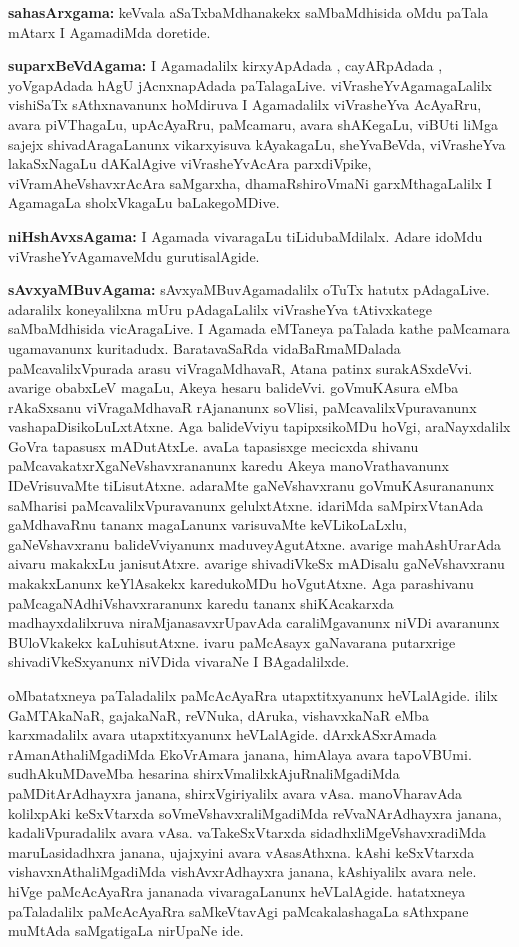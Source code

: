 \textbf{sahasArxgama:} keVvala aSaTxbaMdhanakekx saMbaMdhisida oMdu paTala mAtarx I AgamadiMda doretide.

\textbf{suparxBeVdAgama:} I Agamadalilx kirxyApAdada , cayARpAdada , yoVgapAdada  hAgU jAcnxnapAdada  paTalagaLive. viVrasheYvAgamagaLalilx vishiSaTx sAthxnavanunx hoMdiruva I Agamadalilx viVrasheYva AcAyaRru, avara piVThagaLu, upA\-cAyaRru, paMca\-maru, avara shAKegaLu, viBUti liMga sajejx shivadAragaLanunx vikarxyisuva kAyakagaLu, sheYvaBeVda, viVrasheYva lakaSxNagaLu dAKalAgive viVrasheYvAcAra parxdiVpike, viVramAheVshavxrAcAra saMgarxha, dhamaRshiroVmaNi garxMthagaLalilx I AgamagaLa sholxVkagaLu baLakegoMDive.

\textbf{niHshAvxsAgama:} I Agamada vivaragaLu tiLidubaMdilalx. Adare idoMdu viVrasheYvAgamaveMdu gurutisalAgide.

\textbf{sAvxyaMBuvAgama:}  sAvxyaMBuvAgamadalilx oTuTx hatutx pAdagaLive. adaralilx koneyalilxna mUru pAdagaLalilx viVrasheYva tAtivxkatege saMbaMdhisida vicAragaLive. I Agamada eMTaneya paTalada kathe paMcamara ugamavanunx kuritadudx. BaratavaSaRda vidaBaRmaMDalada paMcavalilxVpurada arasu viVragaMdhavaR, Atana patinx surakASxdeVvi. avarige obabxLeV magaLu, Akeya hesaru balideVvi. goVmuKAsura eMba rAkaSxsanu viVragaMdhavaR rAjananunx soVlisi, paMcavalilxVpuravanunx vashapaDisikoLuLxtAtxne. Aga balideVviyu tapipxsikoMDu hoVgi, araNayxdalilx GoVra tapasusx mADutAtxLe. avaLa tapasisxge mecicxda shivanu paMcavakatxrXgaNeVshavxrananunx karedu Akeya manoVrathavanunx IDeVrisuvaMte tiLisutAtxne. adaraMte gaNeVshavxranu goVmuKAsurananunx saMharisi paMcavalilxV\-puravanunx gelulxtAtxne. idariMda saMpirxVtanAda gaMdhavaRnu tananx magaLanunx varisuvaMte keVLikoLaLxlu, gaNeVshavxranu balideVviyanunx maduveyAgutAtxne. avarige mahAshUrarAda aivaru makakxLu janisutAtxre. avarige shivadiVkeSx mADisalu gaNeVshavxranu makakxLanunx \hbox{keYlAsakekx} karedukoMDu hoVgutAtxne. Aga parashivanu paMcagaNAdhiVshavxraranunx karedu tananx shiKAcakarxda madhayxdalilxruva niraMjana\-savxrUpa\-vAda caraliMgavanunx niVDi avaranunx BUloVkakekx kaLuhisutAtxne. ivaru paMcAsayx gaNavarana putarxrige shivadiVkeSxyanunx niVDida vivaraNe I BAgadalilxde.

\vskip 2pt

oMbatatxneya paTaladalilx paMcAcAyaRra utapxtitxyanunx heVLalAgide. ililx GaMTAkaNaR, gajakaNaR, reVNuka, dAruka, vishavx\-kaNaR eMba karxmadalilx avara utapxtitxyanunx heVLalAgide. dArxkASxrAmada rAmanAthaliMgadiMda EkoVrAmara janana, himAlaya avara tapoVBUmi. sudhAkuMDaveMba hesarina shirxVmalilxkAjuRnaliMgadiMda paMDitArAdhayxra janana, shirxVgiriyalilx avara vAsa. manoVharavAda kolilxpAki keSxVtarxda soVmeVshavxraliMgadiMda reVvaNArAdhayxra janana, kadaliVpuradalilx avara vAsa. vaTakeSxVtarxda sidadhx\-liMgeVshavxradiMda maruLasidadhxra janana, ujajxyini avara vAsasAthxna. kAshi keSxVtarxda vishavxnAthaliMgadiMda vishAvxrAdhayxra janana, kAshiyalilx avara nele. hiVge paMcAcAyaRra jananada vivaragaLanunx heVLalAgide. hatatxneya paTaladalilx paMcAcAyaRra saMkeVtavAgi paMca\-kalashagaLa sAthxpane muMtAda saMgatigaLa nirUpaNe ide.

